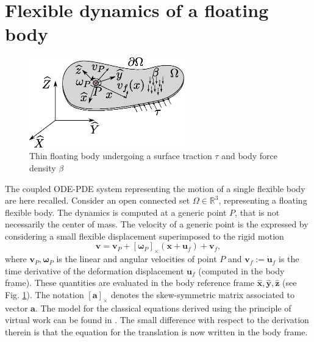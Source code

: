 \documentclass{svjour3}                     %
\newcommand{\crmat}[1]{\ensuremath{[#1]_{\times}}}
\begin{document}
 

\section{Flexible dynamics of a floating body}
\label{sec:class_model}
\begin{figure}[t]
	\centering
	\includegraphics[width=0.6\textwidth]{floating_body.eps} 
	\caption{Thin floating body undergoing a surface traction $\tau$ and body force density $\beta$}
	\label{fig:float_body}
\end{figure}
The coupled ODE-PDE system representing the motion of a single flexible body are here recalled.  Consider an open connected set $\Omega \in \mathbb{R}^3$, representing a floating flexible body. The dynamics is computed at a generic point $P$, that is not necessarily the center of mass. The velocity of a generic point is the expressed by considering a small flexible displacement superimposed to the rigid motion
\[
\bm{v} = \bm{v}_P + \crmat{\bm{\omega}_P} (\bm{x}+\bm{u}_f) + \bm{v}_f,
\]
where $\bm{v}_P, \bm{\omega}_P$ is the linear and angular velocities of point $P$  and $\bm{v}_f := \dot{\bm{u}}_f$ is the time derivative of the deformation displacement $\bm{u}_f$ (computed in the body frame). These quantities are evaluated in the body reference frame $\widehat{\bm{x}}, \widehat{\bm{y}}, \widehat{\bm{z}}$ (see Fig. \ref{fig:float_body}). The notation $\crmat{\bm{a}}$ denotes the skew-symmetric matrix associated to vector $\bm{a}$. The model for the classical equations derived using the principle of virtual work can be found in \cite{MB_Daepde,simeon2013computational}. The small difference with respect to the derivation therein is that the equation for the translation is now written in the body frame. 
\end{document}
